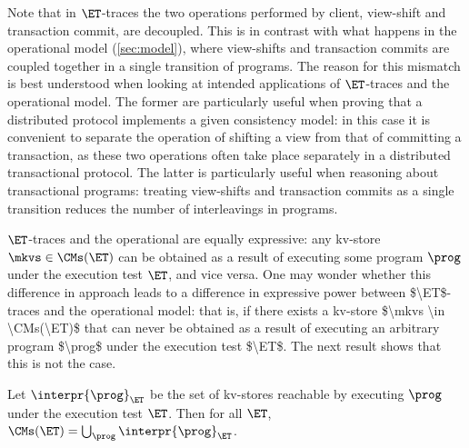 Note that in $\ET$-traces the two operations performed by client, view-shift and 
transaction commit, are decoupled. This is in contrast with what happens in the operational model (\cref{sec:model}), 
where view-shifts and transaction commits are coupled together in a single transition of programs. 
The reason for this mismatch is best understood when looking at intended applications of 
$\ET$-traces and the operational model. The former are particularly useful when proving that a distributed 
protocol implements a given consistency model: in this case it is convenient to separate the operation of shifting a view from that of committing a transaction, 
as these two operations often take place separately in a distributed transactional protocol. The latter is particularly useful when reasoning about transactional 
programs: treating view-shifts and transaction commits as a single transition reduces the number of interleavings in programs.

$\ET$-traces and the operational are equally expressive: 
any kv-store $\mkvs \in \CMs(\ET)$ can be obtained as a result of 
executing some program $\prog$ under the execution test $\ET$, and vice versa.
\ac{One may wonder whether this difference in approach leads to a difference in expressive power between $\ET$-traces 
and the operational model: that is, if there exists a kv-store $\mkvs \in \CMs(\ET)$ that can never be obtained as a 
result of executing an arbitrary program $\prog$ under the execution test $\ET$. The next result shows that 
this is not the case.}
%

\begin{theorem}
	Let $\interpr{\prog}_{\ET}$ be the set of kv-stores reachable by executing $\prog$ under the execution test $\ET$. 
    Then for all $\ET$, $\CMs(\ET) = \bigcup_{\prog} \interpr{\prog}_{\ET}$.
\end{theorem}

